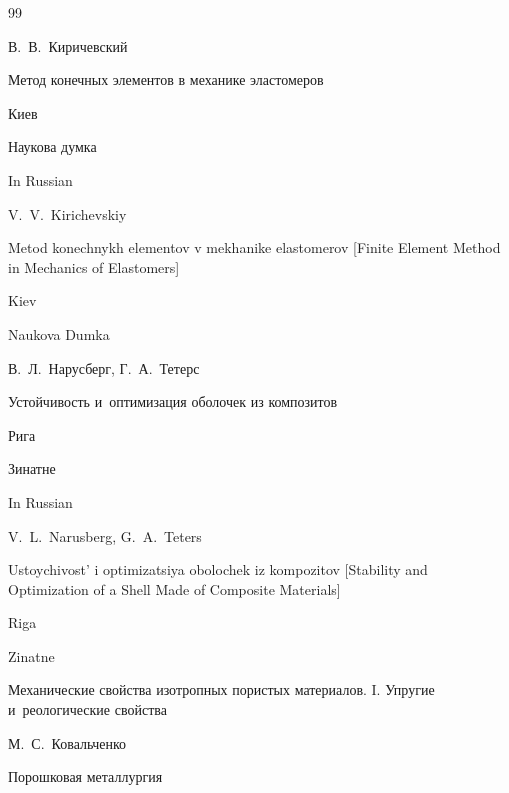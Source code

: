 \begin{thebibliography}{99}

\by В.~В.~Киричевский

\book Метод конечных элементов в механике эластомеров

\publaddr Киев

\publ Наукова думка



\misctransl

\lang In Russian

\by V.~V.~Kirichevskiy 


\book Metod konechnykh elementov v mekhanike elastomerov \rm [Finite Element Method in Mechanics of Elastomers]

\publaddr Kiev

\publ Naukova Dumka






\by В.~Л.~Нарусберг, Г.~А.~Тетерс

\book Устойчивость и~оптимизация оболочек из композитов

\publaddr Рига

\publ Зинатне



\misctransl

\lang In Russian

\by V.~L.~Narusberg, G.~A.~Teters

\book  Ustoychivost' i optimizatsiya obolochek iz kompozitov  \rm [Stability and Optimization of a Shell Made of Composite Materials]

\publaddr Riga

\publ Zinatne 








\paper Механические свойства изотропных пористых материалов. I. Упругие и~реологические свойства

\by М.~С.~Ковальченко

\jour Порошковая металлургия


\end{thebibliography}
